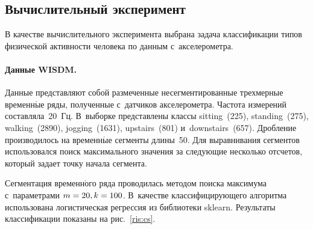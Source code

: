\begin{multicols}{2}
\vspace*{-6pt}

\section{Вычислительный эксперимент}

В качестве вычислительного эксперимента выбрана задача классификации 
типов физической активности человека по данным с~акселерометра.

\vspace*{-6pt}

\paragraph*{Данные WISDM.} Данные представляют собой размеченные 
несегментированные трехмерные временн$\acute{\mbox{ы}}$е ряды, полученные с~датчиков 
ак\-се\-ле\-ро\-мет\-ра. Частота измерений составляла~20~Гц.\linebreak
В~выборке представлены классы sitting~(225), standing~(275), walking~(2890), 
jogging~(1631), upstairs~(801) и~downstairs~(657).
Дробление производилось на временн$\acute{\mbox{ы}}$е сегменты длины~50. 
Для выравнивания сегментов использовался поиск максимального значения 
за следующие несколько отсчетов, который задает точку начала сегмента.

Сегментация временн$\acute{\mbox{о}}$го ряда проводилась методом поиска 
максимума с~параметрами
$m\hm=20, k\hm=100$.   В~качестве классифицирующего алгоритма использована 
логистическая регрессия из библиотеки sklearn. Результаты классификации 
показаны на рис.~\ref{ris:cs}.

\begin{table*}\small 
\begin{center}
   
   
    

\end{center}
\end{table*}
\end{multicols}
